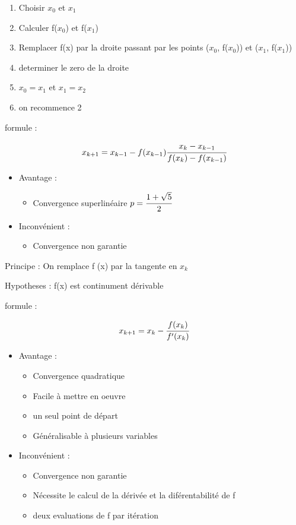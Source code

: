 \begin{enumerate}
    \item Choisir $x_0$ et $x_1$
    \item Calculer f($x_0$) et f($x_1$)
    \item Remplacer f(x) par la droite passant par les points ($x_0$, f($x_0$)) et ($x_1$, f($x_1$))
    \item determiner le zero de la droite
    \item $x_0 = x_1$ et $x_1 = x_2$
    \item on recommence 2
\end{enumerate}

formule :

$$x_{k+1} = x_{k-1} - f(x_{k-1}) \cfrac{x_{k} - x_{k-1}}{f(x_{k}) - f(x_{k-1})}$$


\begin{itemize}
    \item Avantage : 
    \begin{itemize}
        \item Convergence superlinéaire $p = \cfrac{1 + \sqrt{5}}{2}$
    \end{itemize}
    \item Inconvénient : 
    \begin{itemize}
        \item Convergence non garantie
    \end{itemize}
\end{itemize}


Principe :
On remplace f (x) par la tangente en $x_k$

Hypotheses : 
f(x) est continument dérivable

formule : 

$$x_{k+1} = x_k - \cfrac{f(x_k)}{f'(x_k)}$$


\begin{itemize}
    \item Avantage : 
    \begin{itemize}
        \item Convergence quadratique
        \item Facile à mettre en oeuvre
        \item un seul point de départ
        \item Généralisable à plusieurs variables
    \end{itemize}
    \item Inconvénient : 
    \begin{itemize}
        \item Convergence non garantie
        \item Nécessite le calcul de la dérivée et la diférentabilité de f
        \item deux evaluations de f par itération
    \end{itemize}

\end{itemize}	

